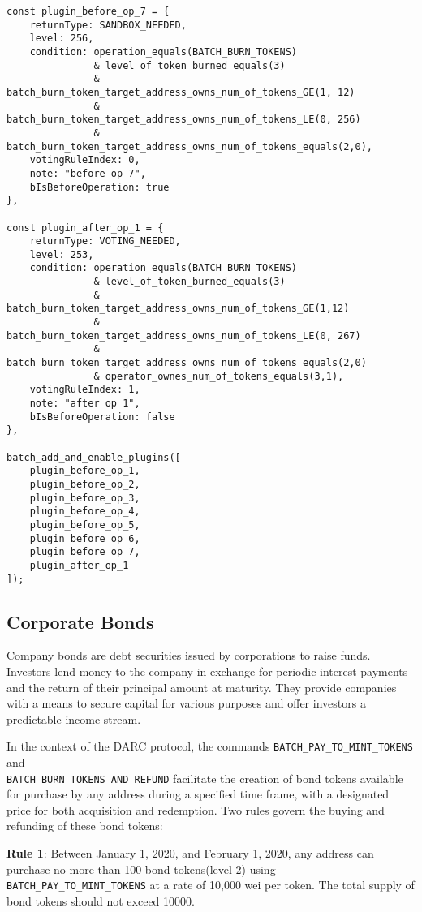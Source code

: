 \documentclass[main.tex]{subfiles}
\begin{document}
\begin{verbatim}
const plugin_before_op_7 = {
    returnType: SANDBOX_NEEDED,
    level: 256, 
    condition: operation_equals(BATCH_BURN_TOKENS)
               & level_of_token_burned_equals(3)
               & batch_burn_token_target_address_owns_num_of_tokens_GE(1, 12)
               & batch_burn_token_target_address_owns_num_of_tokens_LE(0, 256)
               & batch_burn_token_target_address_owns_num_of_tokens_equals(2,0),
    votingRuleIndex: 0, 
    note: "before op 7",
    bIsBeforeOperation: true  
},

const plugin_after_op_1 = {
    returnType: VOTING_NEEDED,
    level: 253, 
    condition: operation_equals(BATCH_BURN_TOKENS)
               & level_of_token_burned_equals(3)
               & batch_burn_token_target_address_owns_num_of_tokens_GE(1,12)
               & batch_burn_token_target_address_owns_num_of_tokens_LE(0, 267)
               & batch_burn_token_target_address_owns_num_of_tokens_equals(2,0) 
               & operator_ownes_num_of_tokens_equals(3,1),
    votingRuleIndex: 1, 
    note: "after op 1",
    bIsBeforeOperation: false  
},

batch_add_and_enable_plugins([
    plugin_before_op_1,
    plugin_before_op_2,
    plugin_before_op_3,
    plugin_before_op_4,
    plugin_before_op_5,
    plugin_before_op_6,
    plugin_before_op_7,
    plugin_after_op_1
]);
\end{verbatim}

\subsection{Corporate Bonds}


Company bonds are debt securities issued by corporations to raise funds. Investors lend money to the company in exchange for periodic interest payments and the return of their principal amount at maturity. They provide companies with a means to secure capital for various purposes and offer investors a predictable income stream.

In the context of the DARC protocol, the commands \texttt{BATCH\_PAY\_TO\_MINT\_TOKENS} and \\ \texttt{BATCH\_BURN\_TOKENS\_AND\_REFUND} facilitate the creation of bond tokens available for purchase by any address during a specified time frame, with a designated price for both acquisition and redemption. Two rules govern the buying and refunding of these bond tokens:

\textbf{Rule 1}: Between January 1, 2020, and February 1, 2020, any address can purchase no more than 100 bond tokens(level-2) using \texttt{BATCH\_PAY\_TO\_MINT\_TOKENS} at a rate of 10,000 wei per token. The total supply of bond tokens should not exceed 10000.
\end{document}
